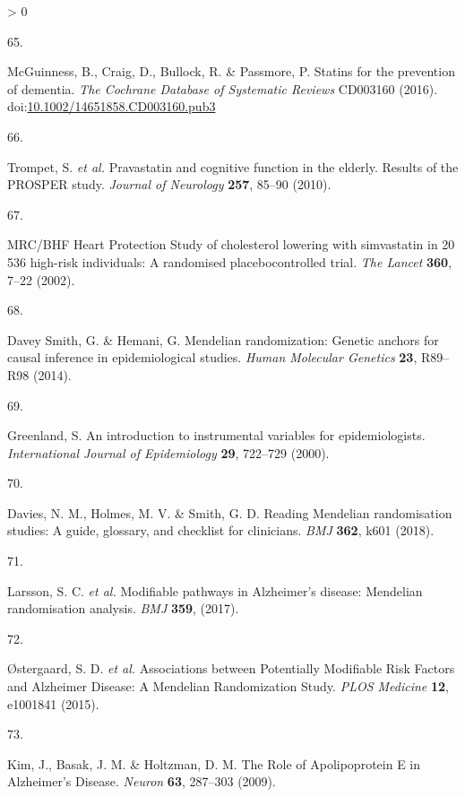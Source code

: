 \documentclass[a4paper, twoside]{templates/ociamthesis}
\newlength{\cslhangindent}
\newlength{\csllabelwidth}
\newenvironment{CSLReferences}[3] %
 {%
  \setlength{\parindent}{0pt}
  \ifodd #1 \everypar{\setlength{\hangindent}{\cslhangindent}}\ignorespaces\fi
  \ifnum #2 > 0
  \setlength{\parskip}{#2\baselineskip}
  \fi
 }%
 {}
\newcommand{\CSLLeftMargin}[1]{\parbox[t]{\maxof{\widthof{#1}}{\csllabelwidth}}{#1}}
\newcommand{\CSLRightInline}[1]{\parbox[t]{\linewidth - \csllabelwidth}{#1}}
\begin{document}
\begin{CSLReferences}{0}{0}
\leavevmode\hypertarget{ref-mcguinness2016}{}%
\CSLLeftMargin{65. }
\CSLRightInline{McGuinness, B., Craig, D., Bullock, R. \& Passmore, P. Statins for the prevention of dementia. \emph{The Cochrane Database of Systematic Reviews} CD003160 (2016). doi:\href{https://doi.org/10.1002/14651858.CD003160.pub3}{10.1002/14651858.CD003160.pub3}}

\leavevmode\hypertarget{ref-trompet2010}{}%
\CSLLeftMargin{66. }
\CSLRightInline{Trompet, S. \emph{et al.} Pravastatin and cognitive function in the elderly. {Results} of the {PROSPER} study. \emph{Journal of Neurology} \textbf{257}, 85--90 (2010).}

\leavevmode\hypertarget{ref-heartprotectionstudycollaborativegroup2002}{}%
\CSLLeftMargin{67. }
\CSLRightInline{{MRC}/{BHF Heart Protection Study} of cholesterol lowering with simvastatin in 20 536 high-risk individuals: A randomised placebocontrolled trial. \emph{The Lancet} \textbf{360}, 7--22 (2002).}

\leavevmode\hypertarget{ref-daveysmith2014}{}%
\CSLLeftMargin{68. }
\CSLRightInline{Davey Smith, G. \& Hemani, G. Mendelian randomization: Genetic anchors for causal inference in epidemiological studies. \emph{Human Molecular Genetics} \textbf{23}, R89--R98 (2014).}

\leavevmode\hypertarget{ref-greenland2000}{}%
\CSLLeftMargin{69. }
\CSLRightInline{Greenland, S. An introduction to instrumental variables for epidemiologists. \emph{International Journal of Epidemiology} \textbf{29}, 722--729 (2000).}

\leavevmode\hypertarget{ref-davies2018}{}%
\CSLLeftMargin{70. }
\CSLRightInline{Davies, N. M., Holmes, M. V. \& Smith, G. D. Reading {Mendelian} randomisation studies: A guide, glossary, and checklist for clinicians. \emph{BMJ} \textbf{362}, k601 (2018).}

\leavevmode\hypertarget{ref-larsson2017}{}%
\CSLLeftMargin{71. }
\CSLRightInline{Larsson, S. C. \emph{et al.} Modifiable pathways in {Alzheimer}'s disease: Mendelian randomisation analysis. \emph{BMJ} \textbf{359}, (2017).}

\leavevmode\hypertarget{ref-ostergaard2015}{}%
\CSLLeftMargin{72. }
\CSLRightInline{Østergaard, S. D. \emph{et al.} Associations between {Potentially Modifiable Risk Factors} and {Alzheimer Disease}: A {Mendelian Randomization Study}. \emph{PLOS Medicine} \textbf{12}, e1001841 (2015).}

\leavevmode\hypertarget{ref-kim2009}{}%
\CSLLeftMargin{73. }
\CSLRightInline{Kim, J., Basak, J. M. \& Holtzman, D. M. The {Role} of {Apolipoprotein E} in {Alzheimer}'s {Disease}. \emph{Neuron} \textbf{63}, 287--303 (2009).}


\end{CSLReferences}
\end{document}
